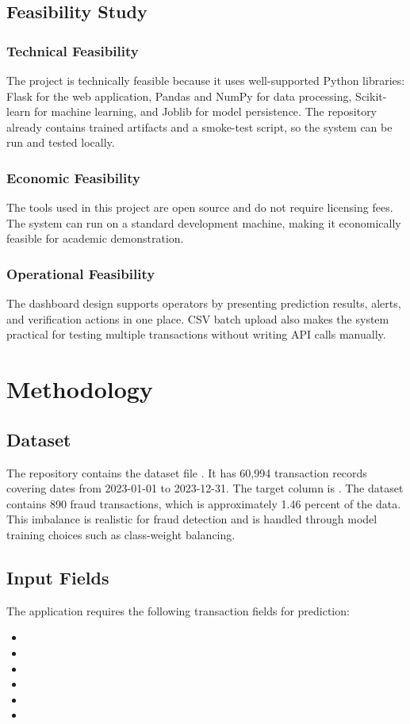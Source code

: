 \documentclass[12pt,a4paper]{report}
\begin{document}
\section{Feasibility Study}
\subsection{Technical Feasibility}
The project is technically feasible because it uses well-supported Python libraries: Flask for the web application, Pandas and NumPy for data processing, Scikit-learn for machine learning, and Joblib for model persistence. The repository already contains trained artifacts and a smoke-test script, so the system can be run and tested locally.

\subsection{Economic Feasibility}
The tools used in this project are open source and do not require licensing fees. The system can run on a standard development machine, making it economically feasible for academic demonstration.

\subsection{Operational Feasibility}
The dashboard design supports operators by presenting prediction results, alerts, and verification actions in one place. CSV batch upload also makes the system practical for testing multiple transactions without writing API calls manually.

\chapter{Methodology}

\section{Dataset}
The repository contains the dataset file . It has 60,994 transaction records covering dates from 2023-01-01 to 2023-12-31. The target column is . The dataset contains 890 fraud transactions, which is approximately 1.46 percent of the data. This imbalance is realistic for fraud detection and is handled through model training choices such as class-weight balancing.

\section{Input Fields}
The application requires the following transaction fields for prediction:
\begin{itemize}
    \item {}
    \item {}
    \item {}
    \item {}
    \item {}
    \item {}
\end{itemize}
\end{document}
